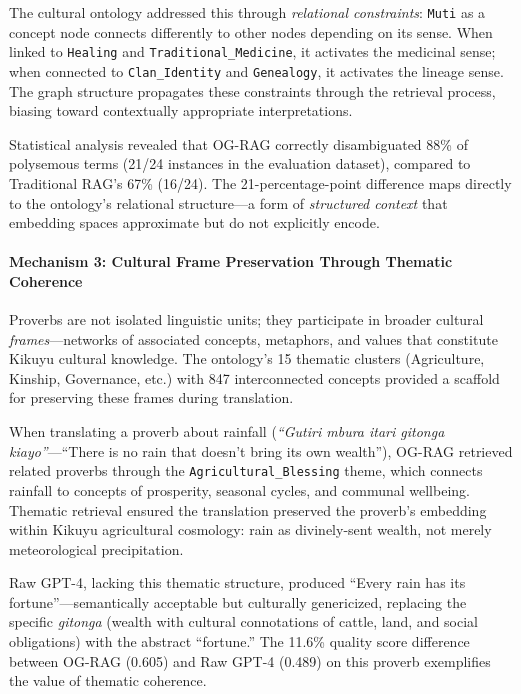 The cultural ontology addressed this through \emph{relational constraints}: \texttt{Muti} as a concept node connects differently to other nodes depending on its sense. When linked to \texttt{Healing} and \texttt{Traditional\_Medicine}, it activates the medicinal sense; when connected to \texttt{Clan\_Identity} and \texttt{Genealogy}, it activates the lineage sense. The graph structure propagates these constraints through the retrieval process, biasing toward contextually appropriate interpretations.

Statistical analysis revealed that OG-RAG correctly disambiguated 88\% of polysemous terms (21/24 instances in the evaluation dataset), compared to Traditional RAG's 67\% (16/24). The 21-percentage-point difference maps directly to the ontology's relational structure—a form of \emph{structured context} that embedding spaces approximate but do not explicitly encode.

\paragraph{Mechanism 3: Cultural Frame Preservation Through Thematic Coherence}

Proverbs are not isolated linguistic units; they participate in broader cultural \emph{frames}—networks of associated concepts, metaphors, and values that constitute Kikuyu cultural knowledge. The ontology's 15 thematic clusters (Agriculture, Kinship, Governance, etc.) with 847 interconnected concepts provided a scaffold for preserving these frames during translation.

When translating a proverb about rainfall (\emph{``Gutiri mbura itari gitonga kiayo''}—``There is no rain that doesn't bring its own wealth''), OG-RAG retrieved related proverbs through the \texttt{Agricultural\_Blessing} theme, which connects rainfall to concepts of prosperity, seasonal cycles, and communal wellbeing. Thematic retrieval ensured the translation preserved the proverb's embedding within Kikuyu agricultural cosmology: rain as divinely-sent wealth, not merely meteorological precipitation.

Raw GPT-4, lacking this thematic structure, produced ``Every rain has its fortune''—semantically acceptable but culturally genericized, replacing the specific \emph{gitonga} (wealth with cultural connotations of cattle, land, and social obligations) with the abstract ``fortune.'' The 11.6\% quality score difference between OG-RAG (0.605) and Raw GPT-4 (0.489) on this proverb exemplifies the value of thematic coherence.

